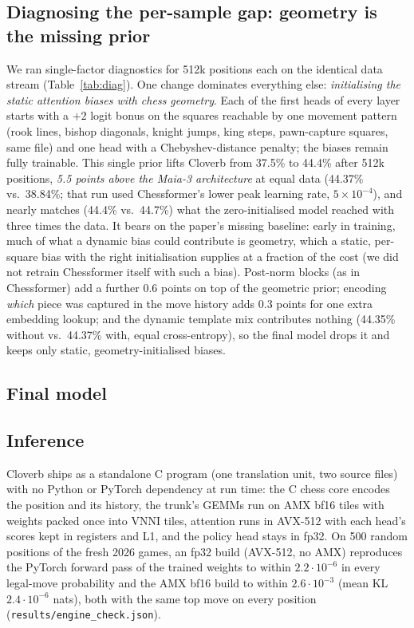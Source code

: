\subsection{Diagnosing the per-sample gap: geometry is the missing prior}\label{sec:diag}

We ran single-factor diagnostics for 512k positions each on the identical data stream
(Table~\ref{tab:diag}). One change dominates everything else: \emph{initialising the static
attention biases with chess geometry}. Each of the first heads of every layer starts with a
$+2$ logit bonus on the squares reachable by one movement pattern (rook lines, bishop diagonals,
knight jumps, king steps, pawn-capture squares, same file) and one head with a Chebyshev-distance
penalty; the biases remain fully trainable. This single prior lifts Cloverb from 37.5\% to
44.4\% after 512k positions, \emph{5.5 points above the Maia-3 architecture} at equal data (44.37\%
vs.\ 38.84\%; that run used Chessformer's lower peak learning rate, $5\times10^{-4}$), and nearly matches
(44.4\% vs.\ 44.7\%) what the zero-initialised model reached with three times the data. It bears on
the paper's missing baseline: early in training, much of what a dynamic bias could contribute is
geometry, which a static, per-square bias with the right initialisation supplies at a fraction of the
cost (we did not retrain Chessformer itself with such a bias).
Post-norm blocks (as in Chessformer) add a further 0.6 points on top of the geometric prior;
encoding \emph{which} piece was captured in the move history adds 0.3 points for one extra
embedding lookup; and the dynamic template mix contributes nothing (44.35\% without vs.\ 44.37\% with, equal
cross-entropy), so the final model drops it and keeps only static, geometry-initialised biases.

\subsection{Final model}\label{sec:final}







\subsection{Inference}

Cloverb ships as a standalone C program (one translation unit, two source files) with no Python or
PyTorch dependency at run time: the C chess core encodes the
position and its history, the trunk's GEMMs run on AMX bf16 tiles with weights packed once into VNNI
tiles, attention runs in AVX-512 with each head's scores kept in registers and L1, and the policy head
stays in fp32. On 500 random positions of the fresh 2026 games, an fp32 build (AVX-512, no AMX)
reproduces the PyTorch forward pass of the trained weights to within $2.2\cdot10^{-6}$ in every
legal-move probability and the AMX bf16 build to within $2.6\cdot10^{-3}$ (mean KL $2.4\cdot10^{-6}$
nats), both with the same top move on every position (\texttt{results/engine\_check.json}).

